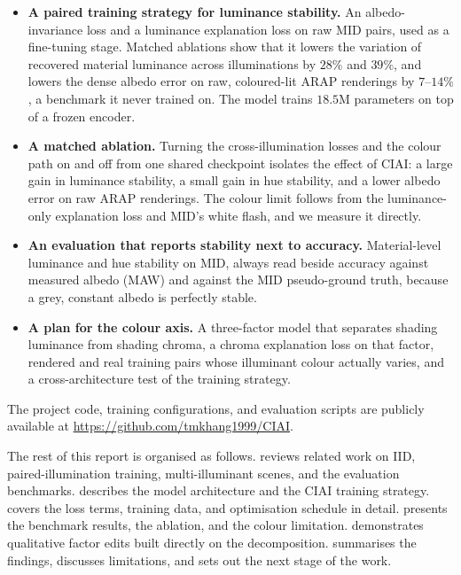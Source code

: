 \begin{itemize}

  \item \textbf{A paired training strategy for luminance stability.}
  An albedo-invariance loss and a luminance explanation loss on raw MID pairs, used as a
  fine-tuning stage. Matched ablations show that it lowers the variation of recovered
  material luminance across illuminations by $28\%$ and $39\%$, and lowers the dense albedo
  error on raw, coloured-lit ARAP renderings by $7$--$14\%$, a benchmark it never trained on.
  The model trains $18.5$M parameters on top of a frozen encoder.

  \item \textbf{A matched ablation.}
  Turning the cross-illumination losses and the colour path on and off from one shared
  checkpoint isolates the effect of CIAI: a large gain in luminance stability, a small gain
  in hue stability, and a lower albedo error on raw ARAP renderings. The colour limit follows
  from the luminance-only explanation loss and MID's white flash, and we measure it directly.

  \item \textbf{An evaluation that reports stability next to accuracy.}
  Material-level luminance and hue stability on MID, always read beside accuracy against
  measured albedo (MAW) and against the MID pseudo-ground truth, because a grey, constant
  albedo is perfectly stable.

  \item \textbf{A plan for the colour axis.}
  A three-factor model that separates shading luminance from shading chroma, a chroma
  explanation loss on that factor, rendered and real training pairs whose illuminant colour
  actually varies, and a cross-architecture test of the training strategy.

\end{itemize}

The project code, training configurations, and evaluation scripts are publicly available at
\url{https://github.com/tmkhang1999/CIAI}.

The rest of this report is organised as follows.
 reviews related work on IID, paired-illumination training,
multi-illuminant scenes, and the evaluation benchmarks.
 describes the model architecture and the CIAI training strategy.
 covers the loss terms, training data, and optimisation
schedule in detail.
 presents the benchmark results, the ablation, and the colour
limitation.
 demonstrates qualitative factor edits built directly on the
decomposition.
 summarises the findings, discusses limitations, and
sets out the next stage of the work.
